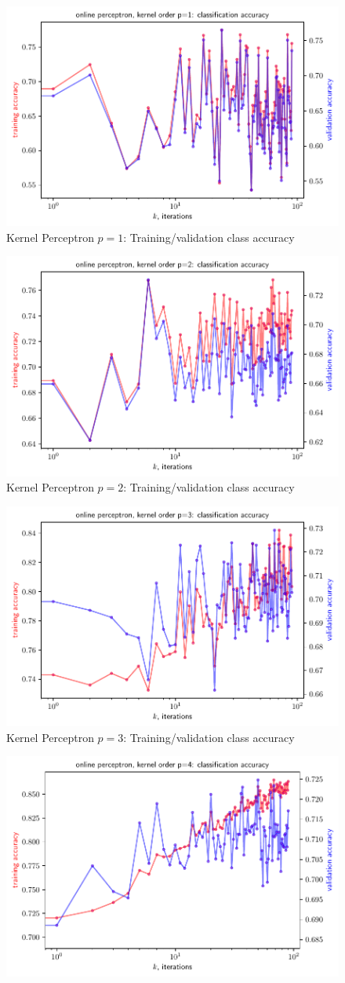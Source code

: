 \documentclass{article}
\begin{document}
{  \begin{figure}[!ht]
    \centering
    \includegraphics[width=0.45\linewidth]{figs/P2aonline_kernelperceptron_plt1.pdf}
    \caption{ Kernel Perceptron $p=1$: Training/validation class accuracy}\label{fig2aa}
  \end{figure}
  \begin{figure}[!ht]
    \centering
    \includegraphics[width=0.45\linewidth]{figs/P2aonline_kernelperceptron_plt2.pdf}
    \caption{ Kernel Perceptron $p=2$: Training/validation class accuracy}\label{fig2ab}
  \end{figure}
  \begin{figure}[!ht]
    \centering
    \includegraphics[width=0.45\linewidth]{figs/P2aonline_kernelperceptron_plt3.pdf}
    \caption{ Kernel Perceptron $p=3$: Training/validation class accuracy}\label{fig2ac}
  \end{figure}
  \begin{figure}[!ht]
    \centering
    \includegraphics[width=0.45\linewidth]{figs/P2aonline_kernelperceptron_plt4.pdf}

\end{figure}}
\end{document}
